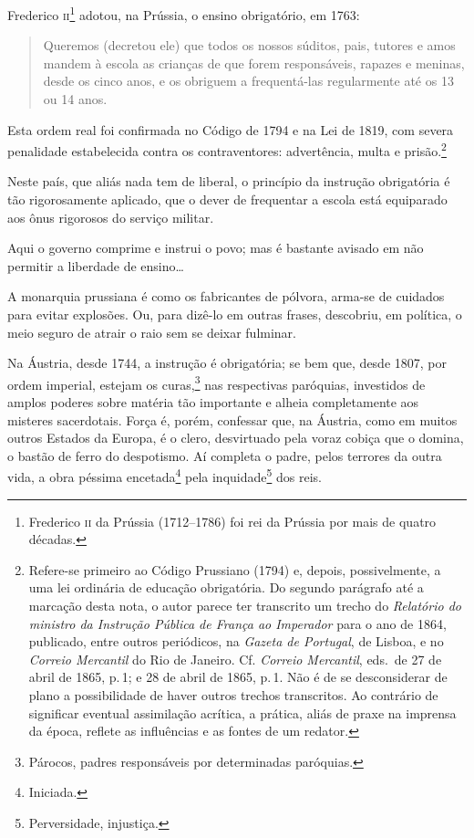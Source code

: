 Frederico \textsc{ii}\footnote{Frederico \textsc{ii} da Prússia (1712--1786) foi rei da
  Prússia por mais de quatro décadas.} adotou, na Prússia, o ensino
obrigatório, em 1763:

\begin{quote}
Queremos (decretou ele) que todos os nossos súditos, pais, tutores e
amos mandem à escola as crianças de que forem responsáveis, rapazes e
meninas, desde os cinco anos, e os obriguem a frequentá-las regularmente
até os 13 ou 14 anos.
\end{quote}

Esta ordem real foi confirmada no Código de 1794 e na Lei de 1819, com
severa penalidade estabelecida contra os contraventores: advertência,
multa e prisão.\footnote{Refere-se primeiro ao Código Prussiano (1794)
  e, depois, possivelmente, a uma lei ordinária de educação obrigatória.
  Do segundo parágrafo até a marcação desta nota, o autor parece ter
  transcrito um trecho do \emph{Relatório do ministro da Instrução
  Pública de França ao Imperador} para o ano de 1864, publicado, entre
  outros periódicos, na \emph{Gazeta de Portugal}, de Lisboa, e no
  \emph{Correio Mercantil} do Rio de Janeiro. Cf. \emph{Correio
  Mercantil}, eds.~de 27 de abril de 1865, p.\,1; e 28 de abril de 1865, p.\,1. Não é de se
  desconsiderar de plano a possibilidade de haver outros trechos
  transcritos. Ao contrário de significar eventual assimilação acrítica,
  a prática, aliás de praxe na imprensa da época, reflete as influências
  e as fontes de um redator.}

Neste país, que aliás nada tem de liberal, o princípio da instrução
obrigatória é tão rigorosamente aplicado, que o dever de frequentar a
escola está equiparado aos ônus rigorosos do serviço militar.

Aqui o governo comprime e instrui o povo; mas é bastante avisado em não
permitir a liberdade de ensino\ldots{}

A monarquia prussiana é como os fabricantes de pólvora, arma-se de
cuidados para evitar explosões. Ou, para dizê-lo em outras frases,
descobriu, em política, o meio seguro de atrair o raio sem se deixar
fulminar.

Na Áustria, desde 1744, a instrução é obrigatória; se bem que, desde
1807, por ordem imperial, estejam os curas,\footnote{Párocos, padres
  responsáveis por determinadas paróquias.} nas respectivas paróquias,
investidos de amplos poderes sobre matéria tão importante e alheia
completamente aos misteres sacerdotais. Força é, porém, confessar que,
na Áustria, como em muitos outros Estados da Europa, é o clero,
desvirtuado pela voraz cobiça que o domina, o bastão de ferro do
despotismo. Aí completa o padre, pelos terrores da outra vida, a obra
péssima encetada\footnote{Iniciada.} pela inquidade\footnote{
  Perversidade, injustiça.} dos reis.

